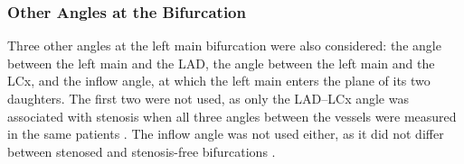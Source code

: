 \subsubsection{Other Angles at the Bifurcation}
\label{sec:method-angle-other}

Three other angles at the left main bifurcation were also considered: the angle between the left main and the LAD, the angle between the left main and the LCx, and the inflow angle, at which the left main enters the plane of its two daughters.
The first two were not used, as only the LAD--LCx angle was associated with stenosis when all three angles between the vessels were measured in the same patients \cite{cui2017bifurcation}.
The inflow angle was not used either, as it did not differ between stenosed and stenosis-free bifurcations \cite{zhang2024curvature}.
